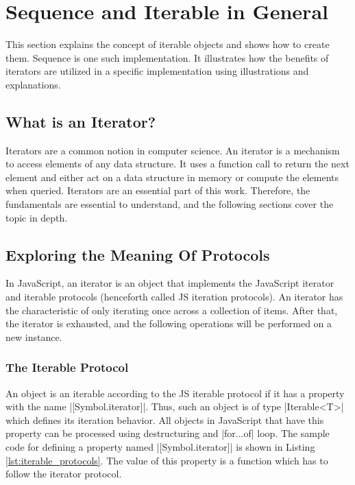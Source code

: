 \section{Sequence and Iterable in General}
\label{sec:Sequence and Iterable in General}
This section explains the concept of iterable objects and shows how to create 
them. Sequence is one such implementation. It illustrates how the benefits of 
iterators are utilized in a specific implementation using illustrations and 
explanations.

\subsection{What is an Iterator?}
\label{sub:What is an Iterator?}
Iterators are a common notion in computer science. An iterator is a mechanism 
to access elements of any data structure. It uses a function call to return the 
next element and either act on a data structure in memory or compute the 
elements when queried. Iterators are an essential part of this work. Therefore, 
the fundamentals are essential to understand, and the following sections cover
the topic in depth.

\subsection{Exploring the Meaning Of Protocols}
\label{sub:Exploring the Meaning Of Protocols}
In JavaScript, an iterator is an object that implements the JavaScript iterator
and iterable protocols \cite{mdn_iteration_2023}
(henceforth called JS iteration protocols). An iterator
has the characteristic of only iterating once across a collection of items.
After that, the iterator is exhausted, and the following operations will be
performed on a new instance.

\subsubsection{The Iterable Protocol}
\label{subsub:The Iterable Protocol}
An object is an iterable according to the JS iterable protocol if it has a
property with the name |[Symbol.iterator]|. Thus, such an object is of type
|Iterable<T>| which defines its iteration behavior.
All objects in JavaScript that have this property can be processed using 
destructuring and |for...of| loop. 
The sample code for defining a property named |[Symbol.iterator]| is shown
in Listing \ref{lst:iterable_protocols}. The value of this property is a
function which has to follow the iterator protocol.

